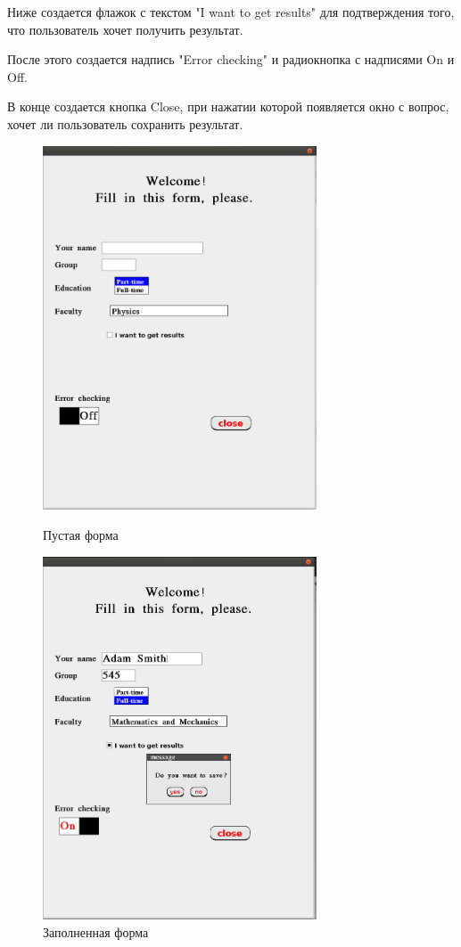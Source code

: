 \documentclass[14pt]{extarticle}
\begin{document}
	Ниже создается флажок с текстом "I want to get results" для подтверждения того, что пользователь хочет получить результат.
	
	После этого создается надпись "Error checking" и радиокнопка с надписями On и Off. 
	
	В конце создается кнопка Close, при нажатии которой появляется окно с вопрос, хочет ли пользователь сохранить результат.
	
	\begin{figure}[h]
		\begin{center}
		\begin{minipage}[h]{0.4\linewidth}
		\includegraphics[width=230pt]{pictures/demo11.png}
		\caption{ Пустая форма} %
		\label{ris:demo1} %
		\end{minipage}
		\hfill 
		\begin{minipage}[h]{0.4\linewidth}
		\includegraphics[width=230pt]{pictures/demo12.png}
		\caption{Заполненная форма}
		\label{ris:demo2}
		\end{minipage}
		\end{center}
		\end{figure}
		
\end{document}
